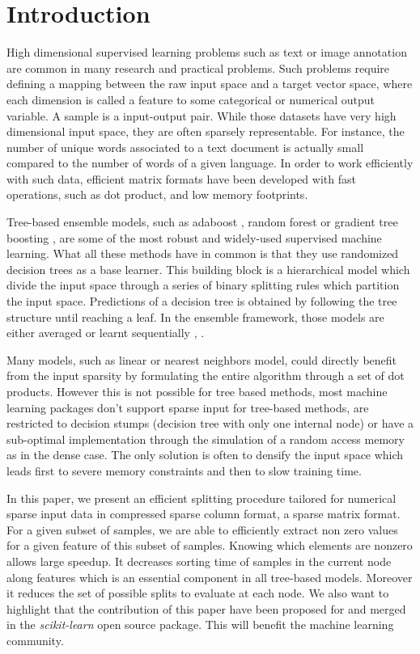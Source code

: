 \section{Introduction}

High dimensional supervised learning problems such as text or image annotation are common in many research and practical problems. Such problems require defining a mapping between the raw input space and a target vector space, where each dimension is called a feature to some categorical or numerical output variable.
 A sample is a input-output pair. While those datasets have very high dimensional input space,
they are often sparsely representable. For instance, the number of unique words
associated to a text document is actually small compared to the number of words of a
given language. In order to work efficiently with such data, efficient matrix
formats have been developed with fast operations, such as dot product, and
low memory footprints.

Tree-based ensemble models, such as adaboost \cite{freund1995desicion}, random
forest \cite{breiman2001random} or gradient tree boosting
\cite{friedman2001greedy}, are some of the most robust and widely-used
supervised machine learning. What all these methods have in common is that they use
randomized decision trees as a base learner. This building block is a
hierarchical model which divide the input space through a series of binary
splitting rules which partition the input space. Predictions of a decision tree is obtained by
following the tree structure until reaching a leaf. In the ensemble framework, those models are either averaged
\cite{breiman2001random} or learnt sequentially \cite{freund1995desicion},
\cite{friedman2001greedy}.

Many models, such as linear or nearest neighbors model, could directly benefit
from the input sparsity by formulating the entire algorithm through a set of
dot products. However this is not possible for tree based methods, most machine
learning packages don't support sparse input for tree-based methods, are
restricted to decision stumps (decision tree with only one internal node) or
have a sub-optimal implementation through the simulation of a random access
memory as in the dense case. The only solution is often to densify the input
space which leads first to severe memory constraints and then to slow
training time.

In this paper, we present an efficient splitting procedure tailored for
numerical sparse input data in compressed sparse column format, a sparse matrix
format. For a given subset of samples, we are able to efficiently extract non
zero values for a given feature of this subset of samples. Knowing which
elements are nonzero allows large speedup. It decreases sorting time of
samples in the current node along features which is an essential component in
all tree-based models. Moreover it reduces the set of possible splits to
evaluate at each node. We also want to highlight that the contribution of this
paper have been proposed for and merged in the  \emph{scikit-learn}
\cite{buitinck2013api,pedregosa2011scikit} open source package. This will
benefit the machine learning community.

